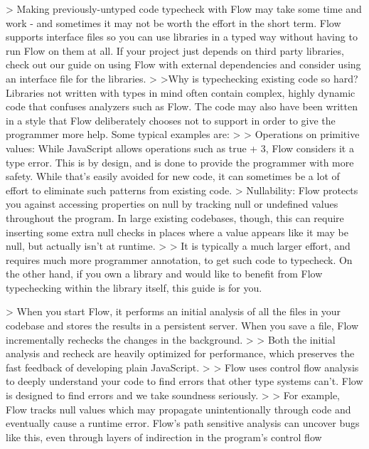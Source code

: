 > Making previously-untyped code typecheck with Flow may take some time and work - and sometimes it may not be worth the effort in the short term. Flow supports interface files so you can use libraries in a typed way without having to run Flow on them at all. If your project just depends on third party libraries, check out our guide on using Flow with external dependencies and consider using an interface file for the libraries.
>
>Why is typechecking existing code so hard? Libraries not written with types in mind often contain complex, highly dynamic code that confuses analyzers such as Flow. The code may also have been written in a style that Flow deliberately chooses not to support in order to give the programmer more help. Some typical examples are:
>
>    Operations on primitive values: While JavaScript allows operations such as true + 3, Flow considers it a type error. This is by design, and is done to provide the programmer with more safety. While that's easily avoided for new code, it can sometimes be a lot of effort to eliminate such patterns from existing code.
>    Nullability: Flow protects you against accessing properties on null by tracking null or undefined values throughout the program. In large existing codebases, though, this can require inserting some extra null checks in places where a value appears like it may be null, but actually isn't at runtime.
>
> It is typically a much larger effort, and requires much more programmer annotation, to get such code to typecheck. On the other hand, if you own a library and would like to benefit from Flow typechecking within the library itself, this guide is for you.


> When you start Flow, it performs an initial analysis of all the files in your codebase and stores the results in a persistent server. When you save a file, Flow incrementally rechecks the changes in the background.
>
> Both the initial analysis and recheck are heavily optimized for performance, which preserves the fast feedback of developing plain JavaScript.
>
> Flow uses control flow analysis to deeply understand your code to find errors that other type systems can't. Flow is designed to find errors and we take soundness seriously.
>
> For example, Flow tracks null values which may propagate unintentionally through code and eventually cause a runtime error. Flow's path sensitive analysis can uncover bugs like this, even through layers of indirection in the program's control flow

